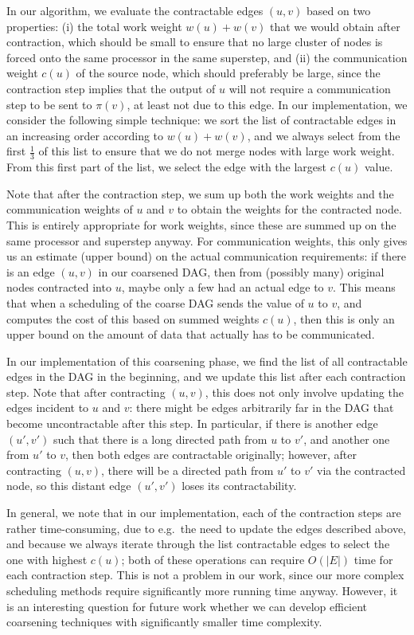 \documentclass[sigconf,nonacm]{acmart}
\begin{document}
In our algorithm, we evaluate the contractable edges $(u,v)$ based on two properties: (i) the total work weight $w(u)+w(v)$ that we would obtain after contraction, which should be small to ensure that no large cluster of nodes is forced onto the same processor in the same superstep, and (ii) the communication weight $c(u)$ of the source node, which should preferably be large, since the contraction step implies that the output of $u$ will not require a communication step to be sent to $\pi(v)$, at least not due to this edge. In our implementation, we consider the following simple technique: we sort the list of contractable edges in an increasing order according to $w(u)+w(v)$, and we always select from the first $\frac{1}{3}$ of this list to ensure that we do not merge nodes with large work weight. From this first part of the list, we select the edge with the largest $c(u)$ value.

Note that after the contraction step, we sum up both the work weights and the communication weights of $u$ and $v$ to obtain the weights for the contracted node. This is entirely appropriate for work weights, since these are summed up on the same processor and superstep anyway. For communication weights, this only gives us an estimate (upper bound) on the actual communication requirements: if there is an edge $(u,v)$ in our coarsened DAG, then from (possibly many) original nodes contracted into $u$, maybe only a few had an actual edge to $v$. This means that when a scheduling of the coarse DAG sends the value of $u$ to $v$, and computes the cost of this based on summed weights $c(u)$, then this is only an upper bound on the amount of data that actually has to be communicated.

In our implementation of this coarsening phase, we find the list of all contractable edges in the DAG in the beginning, and we update this list after each contraction step. Note that after contracting $(u,v)$, this does not only involve updating the edges incident to $u$ and $v$: there might be edges arbitrarily far in the DAG that become uncontractable after this step. In particular, if there is another edge $(u',v')$ such that there is a long directed path from $u$ to $v'$, and another one from $u'$ to $v$, then both edges are contractable originally; however, after contracting $(u,v)$, there will be a directed path from $u'$ to $v'$ via the contracted node, so this distant edge $(u',v')$ loses its contractability.

In general, we note that in our implementation, each of the contraction steps are rather time-consuming, due to e.g.\ the need to update the edges described above, and because we always iterate through the list contractable edges to select the one with highest $c(u)$; both of these operations can require $O(|E|)$ time for each contraction step. This is not a problem in our work, since our more complex scheduling methods require significantly more running time anyway. However, it is an interesting question for future work whether we can develop efficient coarsening techniques with significantly smaller time complexity.
\end{document}
